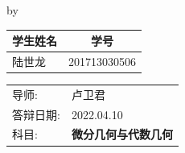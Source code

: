 \begin{titlepage}

\begin{center}

{\makeatletter
\largetitlestyle\fontsize{45}{45}\rmfamily\selectfont\@title
\makeatother}

{\makeatletter
\ifdefvoid{\@subtitle}{}{\bigskip\bfseries\fontsize{20}{20}\selectfont\@subtitle}
\makeatother}

\bigskip
\bigskip

by

\bigskip
\bigskip

{\makeatletter
\largetitlestyle\fontsize{25}{25}\rmfamily\selectfont\@author
\makeatother}

\bigskip
\bigskip

\setlength\extrarowheight{2pt}
\begin{tabular}{lc}
    学生姓名 & 学号 \\\midrule
    陆世龙 & 201713030506 \\
\end{tabular}

\vfill

\begin{tabular}{ll}
    导师: & 卢卫君 \\
    答辩日期: &  2022.04.10\\
    科目: & {\bf 微分几何与代数几何}
\end{tabular}

\bigskip
\bigskip


\end{center}


\end{titlepage}
